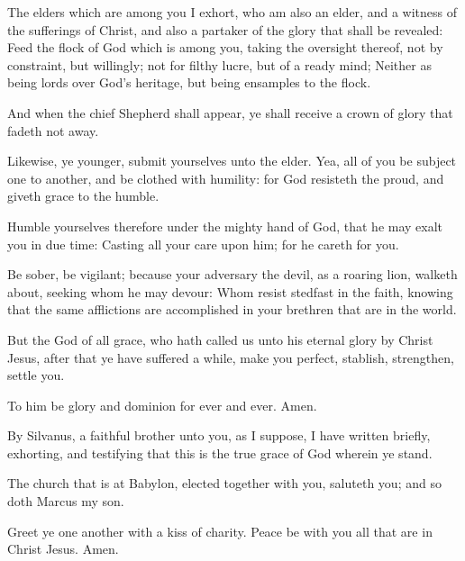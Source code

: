 \Chapter
\Verse The elders which are among you I exhort, who am also an elder, and a witness of the sufferings of Christ, and also a partaker of the glory that shall be revealed: \Verse Feed the flock of God which is among you, taking the oversight thereof, not by constraint, but willingly; not for filthy lucre, but of a ready mind; \Verse Neither as being lords over God's heritage, but being ensamples to the flock.

\Verse And when the chief Shepherd shall appear, ye shall receive a crown of glory that fadeth not away.

\Verse Likewise, ye younger, submit yourselves unto the elder. Yea, all of you be subject one to another, and be clothed with humility: for God resisteth the proud, and giveth grace to the humble.

\Verse Humble yourselves therefore under the mighty hand of God, that he may exalt you in due time: \Verse Casting all your care upon him; for he careth for you.

\Verse Be sober, be vigilant; because your adversary the devil, as a roaring lion, walketh about, seeking whom he may devour: \Verse Whom resist stedfast in the faith, knowing that the same afflictions are accomplished in your brethren that are in the world.

\Verse But the God of all grace, who hath called us unto his eternal glory by Christ Jesus, after that ye have suffered a while, make you perfect, stablish, strengthen, settle you.

\Verse To him be glory and dominion for ever and ever. Amen.

\Verse By Silvanus, a faithful brother unto you, as I suppose, I have written briefly, exhorting, and testifying that this is the true grace of God wherein ye stand.

\Verse The church that is at Babylon, elected together with you, saluteth you; and so doth Marcus my son.

\Verse Greet ye one another with a kiss of charity. Peace be with you all that are in Christ Jesus. Amen.

